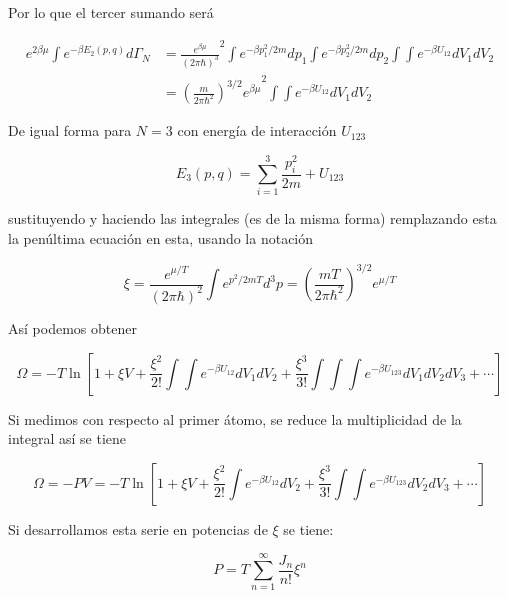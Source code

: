 Por lo que el tercer sumando será

\begin{align}
   e^{2\beta\mu} \int e^{-\beta E_2(p, q)} d\Gamma_N
   &= \frac{e^{\beta\mu}}{{(2\pi\hbar)}^3}^2
    \int e^{-\beta p_1^2/2m} dp_1
    \int e^{-\beta p_2^2/2m} dp_2
   \int \int e^{-\beta U_{12}} dV_1 dV_2\\
    &= {{\left(\frac{m}{2\pi\hbar^2}\right)}^{3/2} e^{\beta\mu}}^2
\int \int e^{-\beta U_{12}} dV_1 dV_2
\end{align}



De igual forma para $N = 3$ con energía de interacción $U_{123}$

\begin{equation}
    E_3(p, q) = \sum_{i=1}^{3} \frac{p_i^2}{2m} + {U_{123}}
\end{equation}


sustituyendo y haciendo las integrales (es de la misma forma)
remplazando esta la penúltima ecuación en esta, usando la notación

\begin{equation}
    \xi = \frac{e^{\mu/T}}{{(2\pi\hbar)}^2}
    \int e^{ p^2/2m T} d^3p 
    = {\left(\frac{mT}{2\pi\hbar^2}\right)}^{3/2}e^{\mu/T}
\end{equation}

Así podemos obtener

\begin{equation}
    \Omega = -T \ln \left[
        1 + \xi V + \frac{\xi^2}{2!}
        \int\int e^{-\beta U_{12}}dV_1 dV_2
        + \frac{\xi^3}{3!} \int\int\int e^{-\beta U_{123}}dV_1 dV_2 dV_3
        + \cdots
    \right]
\end{equation}

Si medimos con respecto al primer átomo, se reduce la multiplicidad de
la integral así se tiene

\begin{equation}
    \Omega = -PV = -T \ln \left[
        1 + \xi V + \frac{\xi^2}{2!}
        \int e^{-\beta U_{12}}dV_2
        + \frac{\xi^3}{3!} \int\int e^{-\beta U_{123}}dV_2 dV_3
        + \cdots
    \right]
\end{equation}


Si desarrollamos esta serie en potencias de $\xi$ se tiene:

\begin{equation}
    P = T \sum_{n = 1}^{\infty}\frac{J_n}{n!}\xi^n
\end{equation}

